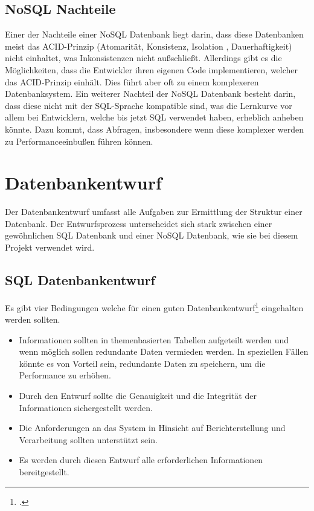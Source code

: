 \subsection{NoSQL Nachteile}
Einer der Nachteile einer NoSQL Datenbank liegt darin, dass diese Datenbanken meist das ACID-Prinzip (Atomarität, Konsistenz, Isolation , Dauerhaftigkeit) nicht einhaltet, was Inkonsistenzen nicht außschließt. 
Allerdings gibt es die Möglichkeiten, dass die Entwickler ihren eigenen Code implementieren, welcher das ACID-Prinzip einhält. 
Dies führt aber oft zu einem komplexeren Datenbanksystem. Ein weiterer Nachteil der NoSQL Datenbank besteht darin, dass diese nicht mit der SQL-Sprache kompatible sind, was die Lernkurve vor allem bei Entwicklern, welche bis jetzt SQL verwendet haben, erheblich anheben könnte. 
Dazu kommt, dass Abfragen, insbesondere wenn diese komplexer werden zu Performanceeinbußen führen können.
\section{Datenbankentwurf}
Der Datenbankentwurf umfasst alle Aufgaben zur Ermittlung der Struktur einer Datenbank. 
Der Entwurfsprozess unterscheidet sich stark zwischen einer gewöhnlichen SQL Datenbank und einer NoSQL Datenbank, wie sie bei diesem Projekt verwendet wird.		
\subsection{SQL Datenbankentwurf} 
Es gibt vier Bedingungen welche für einen guten Datenbankentwurf\footcite{microsoftsql} eingehalten werden sollten.
\begin{itemize}
	\item Informationen sollten in themenbasierten Tabellen aufgeteilt werden und wenn möglich sollen redundante Daten vermieden werden. In speziellen Fällen könnte es von Vorteil sein, redundante Daten zu speichern, um die Performance zu erhöhen.
	\item Durch den Entwurf sollte die Genauigkeit und die Integrität der Informationen sichergestellt werden.
	\item Die Anforderungen an das System in Hinsicht auf Berichterstellung und Verarbeitung sollten unterstützt sein.
	\item Es werden durch diesen Entwurf alle erforderlichen Informationen bereitgestellt. 
\end{itemize}
